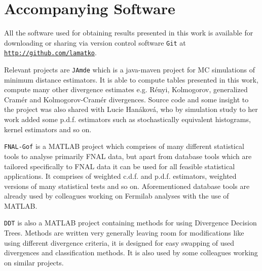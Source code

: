 \chapter{Accompanying Software}

All the software used for obtaining results presented in this work is available for downloading or sharing via version control software \texttt{Git} at  \href{https://github.com/lamatko}{\texttt{http://github.com/lamatko}}. 

Relevant projects are \texttt{JAmde} which is a java-maven project for MC simulations of minimum distance estimators. It is able to compute tables presented in this work, compute many other divergence estimates e.g. Rényi, Kolmogorov, generalized Cramér and Kolmogorov-Cramér divergences. Source code and some insight to the project was also shared with Lucie Hanáková, who by simulation study to her work \cite{Hanakova} added some p.d.f. estimators such as stochastically equivalent histograms, kernel estimators and so on.

\texttt{FNAL-Gof} is a MATLAB project which comprises of many different statistical tools to analyse primarily FNAL data, but apart from database tools which are tailored specifically to FNAL data it can be used for all feasible statistical applications. It comprises of weighted c.d.f. and p.d.f. estimators, weighted versions of many statistical tests and so on. Aforementioned database tools are already used by colleagues working on Fermilab analyses with the use of MATLAB.

\texttt{DDT} is also a MATLAB project containing methods for using Divergence Decision Trees. Methods are written very generally leaving room for modifications like using different divergence criteria, it is designed for easy swapping of used divergences and classification methods. It is also used by some colleagues working on similar projects.
